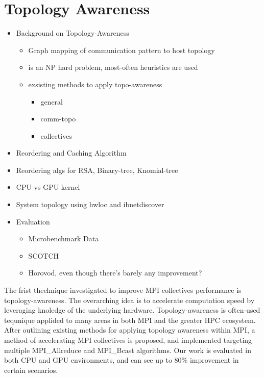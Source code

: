 
\glsresetall %
\chapter[Topology]{Topology Awareness}\label{ch:TopologyAwareness}


\begin{itemize}
    \item Background on Topology-Awareness
    \begin{itemize}
        \item Graph mapping of communication pattern to host topology
        \item is an NP hard problem, most-often heuristics are used
        \item exsisting methods to apply topo-awareness
        \begin{itemize}
            \item general \cite{Hoefler2011GenericTopoMappingStrats, Mirsadeghi2016TopoAwareCollRR, Mirsadeghi2016MAGC}
            \item comm-topo \cite{Gropp2019CartTopoMapping}
            \item collectives \cite{Mercer2011ImprvMPIWithRR, Mirsadeghi2016TopoAwareCollRR}
        \end{itemize}
    \end{itemize}
    \item Reordering and Caching Algorithm
    \item Reordering algs for RSA, Binary-tree, Knomial-tree
    \item CPU vs GPU kernel
    \item System topology using hwloc and ibnetdiscover
    \item Evaluation
    \begin{itemize}
        \item Microbenchmark Data
        \item SCOTCH \cite{Pellegrini2012SCOTCH}
        \item Horovod, even though there's barely any improvement?
    \end{itemize}
\end{itemize}

The frist thechnique investigated to improve MPI collectives performance is topology-awareness.
The overarching idea is to accelerate computation speed by leveraging knoledge of the underlying hardware.
Topology-awareness is often-used tequnique applided to many areas in both MPI and the greater HPC ecosystem.
After outlining existing methods for applying topology awareness within MPI, a method of accelerating MPI collectives is proposed, and implemented targeting multiple MPI\_Allreduce and MPI\_Bcast algorithms.
Our work is evaluated in both CPU and GPU environments, and can see up to 80\% improvement in certain scenarios.

